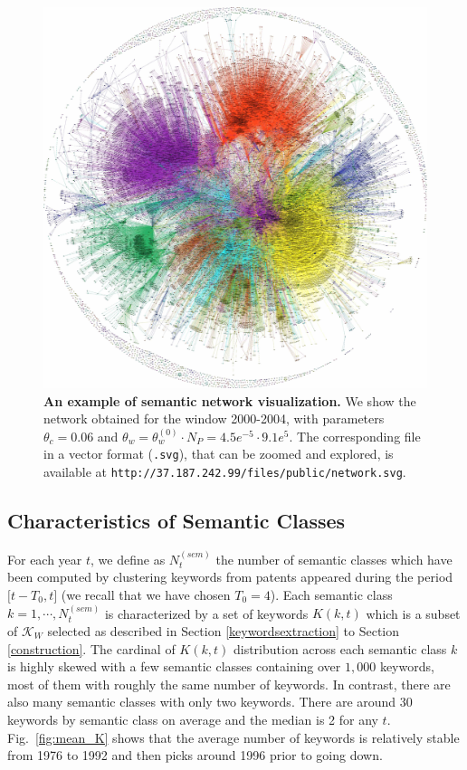 \documentclass[12pt,twoside,a4paper]{article}
\begin{document}
\begin{figure}
\centering
\includegraphics[width=\textwidth]{striking.jpg}
\caption{\textbf{An example of semantic network visualization.} We show the network obtained for the window 2000-2004, with parameters $\theta_c = 0.06$ and $\theta_w = \theta_w^{(0)}\cdot N_P = 4.5e^{-5} \cdot 9.1e^{5}$. The corresponding file in a vector format (\texttt{.svg}), that can be zoomed and explored, is available at \texttt{http://37.187.242.99/files/public/network.svg}.}
\label{fig:rawnetwork}
\end{figure}



\subsection{Characteristics of Semantic Classes}
\label{characteristics}
For each year $t$, we define as $N^{(sem)}_t$ the number of semantic classes which have been computed by clustering keywords from patents appeared during the period $\big[ t-T_0, t \big]$ (we recall that we have chosen $T_0=4$). Each semantic class $k =  1, \cdots, N^{(sem)}_t$ is characterized by a set of keywords $K(k,t)$ which is a subset of $\mathcal{K}_W$ selected as described in Section \ref{keywordsextraction} to Section \ref{construction}. The cardinal of $K(k, t)$ distribution across each semantic class $k$ is highly skewed with a few semantic classes containing over $1,000$ keywords, most of them with roughly the same number of keywords. In contrast, there are also many semantic classes with only two keywords. There are around 30 keywords by semantic class on average and the median is 2 for any $t$. Fig.~\ref{fig:mean_K} shows that the average number of keywords is relatively stable from 1976 to 1992 and then picks around 1996 prior to going down.
\end{document}
